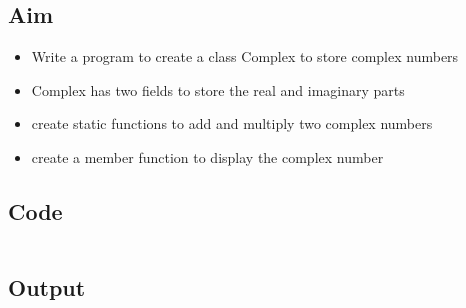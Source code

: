 \documentclass[../main.tex]{subfiles}
\begin{document}
\subsection{Aim}
\begin{itemize}
	\item Write a program to create a class Complex to store complex numbers
	\item Complex has two fields to store the real and imaginary parts
	\item create static functions to add and multiply two complex numbers
	\item create a member function to display the complex number
\end{itemize}

\subsection{Code}
\inputminted[frame=lines, breaklines, breakanywhere, numberblanklines=false]{java}{./programs/prog2/Complex.java}

\subsection{Output}
\end{document}
